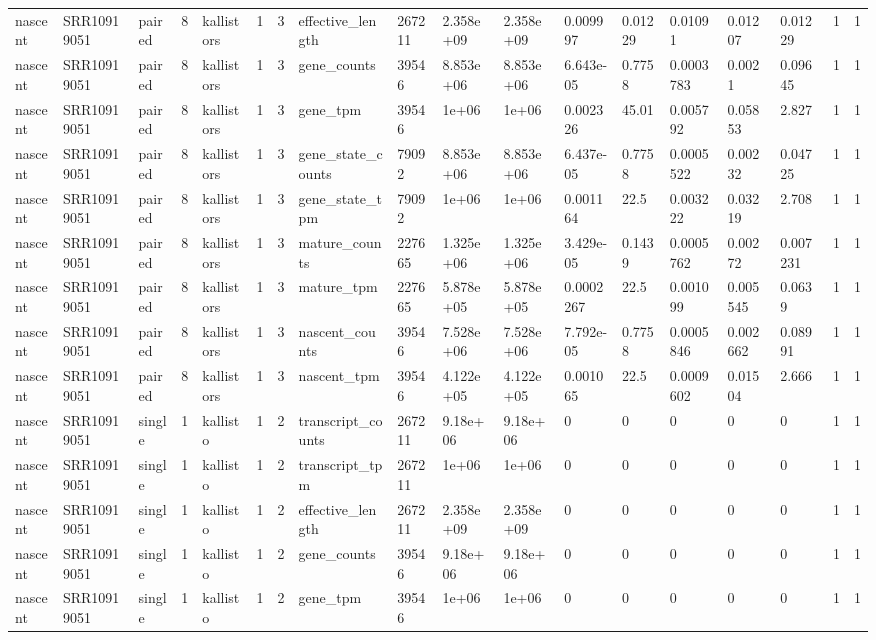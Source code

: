 \begin{tabular}{llllllllllllllllll}
nascent & SRR10919051 & paired & 8 & kallistors & 1 & 3 & effective\_length & 267211 & 2.358e+09 & 2.358e+09 & 0.009997 & 0.01229 & 0.01091 & 0.01207 & 0.01229 & 1 & 1 \\
nascent & SRR10919051 & paired & 8 & kallistors & 1 & 3 & gene\_counts & 39546 & 8.853e+06 & 8.853e+06 & 6.643e-05 & 0.7758 & 0.0003783 & 0.0021 & 0.09645 & 1 & 1 \\
nascent & SRR10919051 & paired & 8 & kallistors & 1 & 3 & gene\_tpm & 39546 & 1e+06 & 1e+06 & 0.002326 & 45.01 & 0.005792 & 0.05853 & 2.827 & 1 & 1 \\
nascent & SRR10919051 & paired & 8 & kallistors & 1 & 3 & gene\_state\_counts & 79092 & 8.853e+06 & 8.853e+06 & 6.437e-05 & 0.7758 & 0.0005522 & 0.00232 & 0.04725 & 1 & 1 \\
nascent & SRR10919051 & paired & 8 & kallistors & 1 & 3 & gene\_state\_tpm & 79092 & 1e+06 & 1e+06 & 0.001164 & 22.5 & 0.003222 & 0.03219 & 2.708 & 1 & 1 \\
nascent & SRR10919051 & paired & 8 & kallistors & 1 & 3 & mature\_counts & 227665 & 1.325e+06 & 1.325e+06 & 3.429e-05 & 0.1439 & 0.0005762 & 0.00272 & 0.007231 & 1 & 1 \\
nascent & SRR10919051 & paired & 8 & kallistors & 1 & 3 & mature\_tpm & 227665 & 5.878e+05 & 5.878e+05 & 0.0002267 & 22.5 & 0.001099 & 0.005545 & 0.0639 & 1 & 1 \\
nascent & SRR10919051 & paired & 8 & kallistors & 1 & 3 & nascent\_counts & 39546 & 7.528e+06 & 7.528e+06 & 7.792e-05 & 0.7758 & 0.0005846 & 0.002662 & 0.08991 & 1 & 1 \\
nascent & SRR10919051 & paired & 8 & kallistors & 1 & 3 & nascent\_tpm & 39546 & 4.122e+05 & 4.122e+05 & 0.001065 & 22.5 & 0.0009602 & 0.01504 & 2.666 & 1 & 1 \\
nascent & SRR10919051 & single & 1 & kallisto & 1 & 2 & transcript\_counts & 267211 & 9.18e+06 & 9.18e+06 & 0 & 0 & 0 & 0 & 0 & 1 & 1 \\
nascent & SRR10919051 & single & 1 & kallisto & 1 & 2 & transcript\_tpm & 267211 & 1e+06 & 1e+06 & 0 & 0 & 0 & 0 & 0 & 1 & 1 \\
nascent & SRR10919051 & single & 1 & kallisto & 1 & 2 & effective\_length & 267211 & 2.358e+09 & 2.358e+09 & 0 & 0 & 0 & 0 & 0 & 1 & 1 \\
nascent & SRR10919051 & single & 1 & kallisto & 1 & 2 & gene\_counts & 39546 & 9.18e+06 & 9.18e+06 & 0 & 0 & 0 & 0 & 0 & 1 & 1 \\
nascent & SRR10919051 & single & 1 & kallisto & 1 & 2 & gene\_tpm & 39546 & 1e+06 & 1e+06 & 0 & 0 & 0 & 0 & 0 & 1 & 1 \\

\end{tabular}
